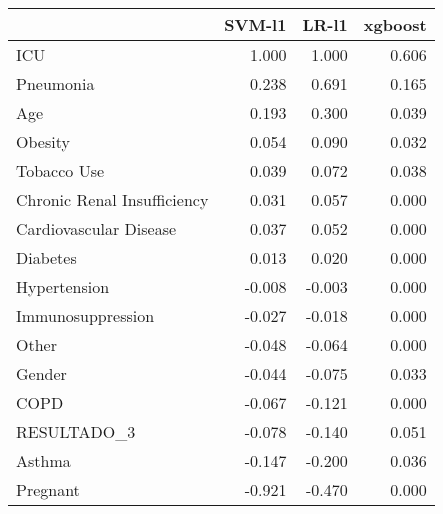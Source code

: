 \begin{tabular}{lrrr}
\toprule
{} &  SVM-l1 &  LR-l1 &  xgboost \\
\midrule
ICU                         &   1.000 &  1.000 &    0.606 \\
Pneumonia                   &   0.238 &  0.691 &    0.165 \\
Age                         &   0.193 &  0.300 &    0.039 \\
Obesity                     &   0.054 &  0.090 &    0.032 \\
Tobacco Use                 &   0.039 &  0.072 &    0.038 \\
Chronic Renal Insufficiency &   0.031 &  0.057 &    0.000 \\
Cardiovascular Disease      &   0.037 &  0.052 &    0.000 \\
Diabetes                    &   0.013 &  0.020 &    0.000 \\
Hypertension                &  -0.008 & -0.003 &    0.000 \\
Immunosuppression           &  -0.027 & -0.018 &    0.000 \\
Other                       &  -0.048 & -0.064 &    0.000 \\
Gender                      &  -0.044 & -0.075 &    0.033 \\
COPD                        &  -0.067 & -0.121 &    0.000 \\
RESULTADO\_3                 &  -0.078 & -0.140 &    0.051 \\
Asthma                      &  -0.147 & -0.200 &    0.036 \\
Pregnant                    &  -0.921 & -0.470 &    0.000 \\
\bottomrule
\end{tabular}
